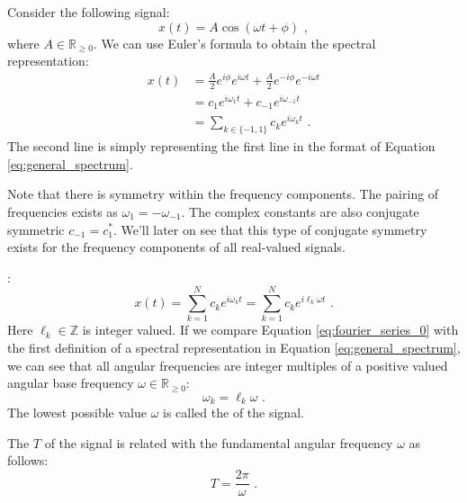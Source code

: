 Consider the following signal:
\begin{equation}
  x(t)=A\cos(\omega t+\phi) \,\,,
\end{equation}
where $A\in \mathbb{R}_{\ge 0}$. We can use Euler's formula to obtain the spectral representation:
\begin{align}
  x(t) & = \frac{A}{2}e^{i\phi}e^{i\omega t} + \frac{A}{2}e^{-i\phi}e^{-i\omega t} \\
       & = c_1 e^{i\omega_1 t} + c_{-1} e^{i\omega_{-1} t}                         \\
       & = \sum_{k\in\{-1,1\}} c_k e^{i\omega_k t} \,\,.
\end{align}
The second line is simply representing the first line in the format of Equation \ref{eq:general_spectrum}.

Note that there is symmetry within the frequency components. The pairing of frequencies exists as $\omega_{1}=-\omega_{-1}$.
The complex constants are also conjugate symmetric $c_{-1} = c_{1}^*$. We'll later on see
that this type of conjugate symmetry exists for the frequency components of all real-valued signals.

:
\begin{equation}
  x(t) = \sum_{k=1}^N c_k e^{i \omega_k t} = \sum_{k=1}^N c_k e^{i \ell_k \omega t} \,\,.
  \label{eq:fourier_series_0}
\end{equation}
Here $\ell_k \in \mathbb{Z}$ is integer valued. If we compare Equation \ref{eq:fourier_series_0} with
the first definition of a spectral representation in Equation \ref{eq:general_spectrum}, we can see
that all angular frequencies are integer multiples of a positive valued angular
base frequency $\omega \in \mathbb{R}_{\ge 0}$:
\begin{equation}
  \omega_k = \ell_k\omega \,\,.
  \label{eq:integer_multiple}
\end{equation}
The lowest possible value $\omega$ is called
the \emph{} of the signal. 

The \emph{} $T$ of the
signal is related with the fundamental angular frequency $\omega$ as
follows:
\begin{equation}
  \boxed{
    T = \frac{2\pi}{\omega}
  } \,\,.
  \label{eq:fundamental_period}
\end{equation}

